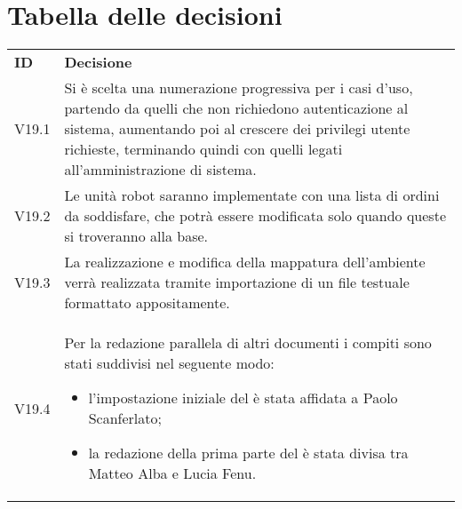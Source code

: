 \documentclass[]{article}
\begin{document}
	\newpage

	\section{Tabella delle decisioni}

		\begin{table} [h!]
			\begin{center}
				\begin{tabular} { m{2cm} m{14cm} }
					\rowcolor{lightgray}
					\textbf{ID} & \textbf{Decisione}\\
					V19.1 & Si è scelta una numerazione progressiva per i casi d'uso, partendo da quelli che non richiedono autenticazione al sistema, aumentando poi al crescere dei privilegi utente richieste, terminando quindi con quelli legati all'amministrazione di sistema.\\
					V19.2 & Le unità robot saranno implementate con una lista di ordini da soddisfare, che potrà essere modificata solo quando queste si troveranno alla base.\\
					V19.3 & La realizzazione e modifica della mappatura dell'ambiente verrà realizzata tramite importazione di un file testuale formattato appositamente.\\
					V19.4 & Per la redazione parallela di altri documenti i compiti sono stati suddivisi nel seguente modo:
					\begin{itemize}
						\item l'impostazione iniziale del \dext{Glossario} è stata affidata a Paolo Scanferlato;
						\item la redazione della prima parte del \dext{Piano di Qualifica} è stata divisa tra Matteo Alba e Lucia Fenu.
					\end{itemize}\\
				\end{tabular}
			\end{center}
		\end{table}
\end{document}
